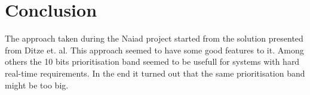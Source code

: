 \section{Conclusion}\label{sec:conclusion}
The approach taken during the Naiad project started from the solution presented
from Ditze et. al. This approach seemed to have some good features to it. Among
others the 10 bits prioritisation band seemed to be usefull for systems with
hard real-time requirements. In the end it turned out that the same
prioritisation band might be too big.

